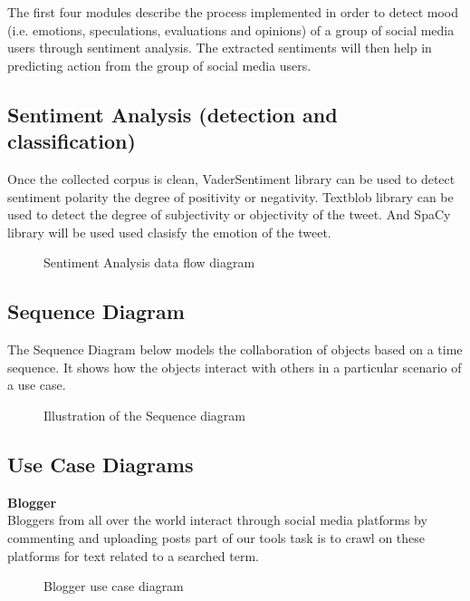 The first four modules describe the process implemented in order to detect mood (i.e. emotions,
speculations, evaluations and opinions) of a group of social media users through sentiment
analysis. The extracted sentiments will then help in predicting action from the group of social
media users.

\subsection{Sentiment Analysis (detection and classification)}
Once the collected corpus is clean, VaderSentiment library can be used to detect sentiment polarity the degree of positivity or negativity. Textblob library can be used to detect the degree of subjectivity or objectivity of the tweet. And SpaCy library will be used used clasisfy the emotion of the tweet.

\begin{figure}[h]
  \centering
  \caption[Example figure]%
  {Sentiment Analysis data flow diagram}
  \label{fig:ALAP:sm1}
\end{figure}


\subsection{Sequence Diagram}
The Sequence Diagram below models the collaboration of objects based on a time sequence.
It shows how the objects interact with others in a particular scenario of a use case.

\begin{figure}[h]
  \centering
  \caption[Example figure]%
  {Illustration of the Sequence diagram}
  \label{fig:ALAP:sm1}
\end{figure}


\subsection{Use Case Diagrams}
\textbf{Blogger}\\
Bloggers from all over the world interact through social media platforms by commenting and
uploading posts part of our tool\textquotesingle s task is to crawl on these platforms for text related to a searched term. 



\begin{figure}[h]
  \centering
  \caption[Example figure]%
  {Blogger use case diagram}
  \label{fig:ALAP:sm1}
\end{figure}

